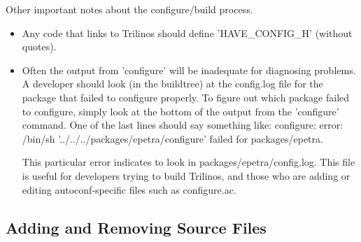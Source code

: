 \documentclass[12pt,relax]{SANDreport}
\begin{document}
Other important notes about the configure/build process.
\begin{itemize}
\item Any code that links to Trilinos should define 'HAVE\_CONFIG\_H' (without
quotes).
\item Often the output from 'configure' will be inadequate for diagnosing 
problems.  A developer should look (in the buildtree) at the config.log file 
for the package that failed to configure properly.  To figure out which 
package failed to configure, simply look at the bottom of the output from the 
'configure' command.  One of the last lines should say something like:
configure: error: /bin/sh '../../../packages/epetra/configure' failed 
for packages/epetra.

This particular error indicates to look in packages/epetra/config.log.  This 
file is useful for developers trying to build Trilinos, and those who are 
adding or editing autoconf-specific files such as configure.ac.
\end{itemize}

\subsection{Adding and Removing Source Files}
\end{document}
